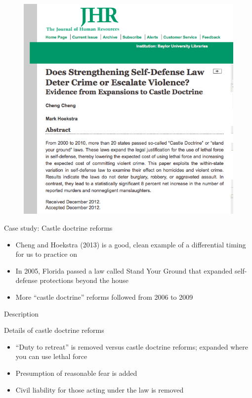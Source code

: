 \documentclass{beamer}
\begin{document}
\begin{frame}[plain]
	\begin{figure}
	\includegraphics[scale=0.5]{./lecture_includes/cheng_and_hoekstra_jhr.png}
	\end{figure}

\end{frame}

\begin{frame}{Case study: Castle doctrine reforms}

\begin{itemize}

\item Cheng and Hoekstra (2013) is a good, clean example of a differential timing for us to practice on
\item In 2005, Florida passed a law called Stand Your Ground that expanded self-defense protections beyond the house
\item More ``castle doctrine'' reforms followed from 2006 to 2009

\end{itemize}

\end{frame}

\begin{frame}{Description}

Details of castle doctrine reforms
		\begin{itemize}
		\item ``Duty to retreat'' is removed versus castle doctrine reforms; expanded where you can use lethal force
		\item Presumption of reasonable fear is added
		\item Civil liability for those acting under the law is removed
		\end{itemize}
\end{frame}
\end{document}
